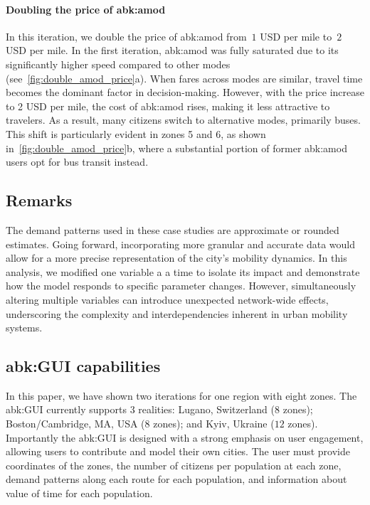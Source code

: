 \paragraph*{Doubling the price of \gls{abk:amod}}
In this iteration, we double the price of \gls{abk:amod} from~$1$ USD per mile to~$2$ USD per mile. 
In the first iteration, \gls{abk:amod} was fully saturated due to its significantly higher speed compared to other modes (see~\cref{fig:double_amod_price}a).
When fares across modes are similar, travel time becomes the dominant factor in decision-making.
However, with the price increase to 2 USD per mile, the cost of \gls{abk:amod} rises, making it less attractive to travelers.
As a result, many citizens switch to alternative modes, primarily buses.
This shift is particularly evident in zones 5 and 6, as shown in~\cref{fig:double_amod_price}b, where a substantial portion of former \gls{abk:amod} users opt for bus transit instead.


\subsection{Remarks}
The demand patterns used in these case studies are approximate or rounded estimates.
Going forward, incorporating more granular and accurate data would allow for a more precise representation of the city's mobility dynamics.
In this analysis, we modified one variable a a time to isolate its impact and demonstrate how the model responds to specific parameter changes.
However, simultaneously altering multiple variables can introduce unexpected network-wide effects, underscoring the complexity and interdependencies inherent in urban mobility systems.


\subsection{\gls{abk:GUI} capabilities}
In this paper, we have shown two iterations for one region with eight zones.
The \gls{abk:GUI} currently supports 3 realities: Lugano, Switzerland ($8$ zones); 
Boston/Cambridge, MA, USA ($8$ zones); and Kyiv, Ukraine ($12$ zones). 
Importantly the \gls{abk:GUI} is designed with a strong emphasis on user engagement, allowing users to contribute and model their own cities.
The user must provide coordinates of the zones, the number of citizens per population at each zone, demand patterns along each route for each population, and information about value of time for each population.

